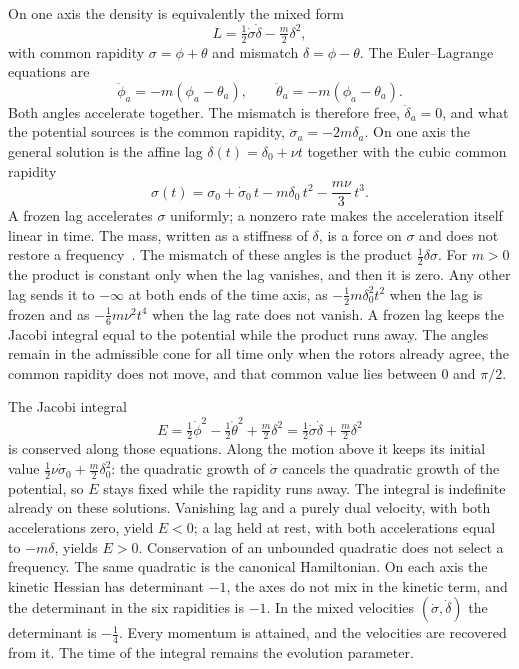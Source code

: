 \documentclass[a4paper]{article}
\begin{document}
On one axis the density is equivalently the mixed form
\[
L=\tfrac12\dot\sigma\dot\delta-\tfrac m2\delta^2,
\]
with common rapidity $\sigma=\phi+\theta$ and mismatch $\delta=\phi-\theta$. The Euler--Lagrange equations are
\[
\ddot{\phi}_a = -m (\phi_a - \theta_a), \qquad \ddot{\theta}_a = -m (\phi_a - \theta_a).
\]
Both angles accelerate together. The mismatch is therefore free, $\ddot\delta_a=0$, and what the potential sources is the common rapidity, $\ddot\sigma_a=-2m\delta_a$. On one axis the general solution is the affine lag $\delta(t)=\delta_0+\nu t$ together with the cubic common rapidity
\[
\sigma(t)=\sigma_0+\dot\sigma_0\,t-m\delta_0\,t^2-\frac{m\nu}{3}\,t^3.
\]
A frozen lag accelerates $\sigma$ uniformly; a nonzero rate makes the acceleration itself linear in time. The mass, written as a stiffness of $\delta$, is a force on $\sigma$ and does not restore a frequency~\cite{dst-dynamic-equation}. The mismatch of these angles is the product $\tfrac12\delta\sigma$. For $m>0$ the product is constant only when the lag vanishes, and then it is zero. Any other lag sends it to $-\infty$ at both ends of the time axis, as $-\tfrac12 m\delta_0^2 t^2$ when the lag is frozen and as $-\tfrac16 m\nu^2 t^4$ when the lag rate does not vanish. A frozen lag keeps the Jacobi integral equal to the potential while the product runs away. The angles remain in the admissible cone for all time only when the rotors already agree, the common rapidity does not move, and that common value lies between $0$ and $\pi/2$.

The Jacobi integral
\[
E=\tfrac12\dot\phi^2-\tfrac12\dot\theta^2+\tfrac m2\delta^2
=\tfrac12\dot\sigma\dot\delta+\tfrac m2\delta^2
\]
is conserved along those equations. Along the motion above it keeps its initial value $\tfrac12\nu\dot\sigma_0+\tfrac m2\delta_0^2$: the quadratic growth of $\dot\sigma$ cancels the quadratic growth of the potential, so $E$ stays fixed while the rapidity runs away. The integral is indefinite already on these solutions. Vanishing lag and a purely dual velocity, with both accelerations zero, yield $E<0$; a lag held at rest, with both accelerations equal to $-m\delta$, yields $E>0$. Conservation of an unbounded quadratic does not select a frequency. The same quadratic is the canonical Hamiltonian. On each axis the kinetic Hessian has determinant $-1$, the axes do not mix in the kinetic term, and the determinant in the six rapidities is $-1$. In the mixed velocities $(\dot\sigma,\dot\delta)$ the determinant is $-\tfrac14$. Every momentum is attained, and the velocities are recovered from it. The time of the integral remains the evolution parameter.
\end{document}
